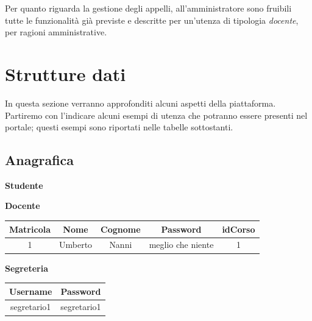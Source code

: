 \documentclass [a4paper,11pt]{book}
\begin{document}
Per quanto riguarda la gestione degli appelli, all'amministratore sono fruibili tutte le funzionalità già previste e descritte per un'utenza di tipologia \emph{docente}, per ragioni amministrative.

\medskip

\section{Strutture dati}
In questa sezione verranno approfonditi alcuni aspetti della piattaforma. Partiremo con l'indicare alcuni esempi di utenza che potranno essere presenti nel portale; questi esempi sono riportati nelle tabelle sottostanti.

\medskip

\subsection{Anagrafica}

\textbf{Studente}

\medskip


\medskip

\textbf{Docente}

\medskip

\begin{tabular}{|c|c|c|c|c|}
\hline
Matricola & Nome & Cognome & Password & idCorso\\
\hline
1 & Umberto & Nanni & meglio che niente & 1\\
\hline
\end{tabular}

\medskip

\textbf{Segreteria}

\medskip

\begin{tabular}{|c|c|}
\hline
Username & Password \\
\hline
segretario1 & segretario1\\
\hline
\end{tabular}

\medskip
\end{document}
